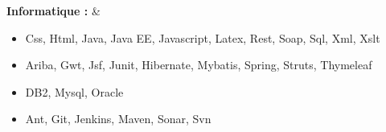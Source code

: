 \textbf{Informatique :}
& \begin{itemize}
    \item Css, Html, Java, Java EE, Javascript, Latex, Rest, Soap, Sql, Xml, Xslt
    \item Ariba, Gwt, Jsf, Junit, Hibernate, Mybatis, Spring, Struts, Thymeleaf
    \item DB2, Mysql, Oracle
    \item Ant, Git, Jenkins, Maven, Sonar, Svn
\end{itemize} \\
